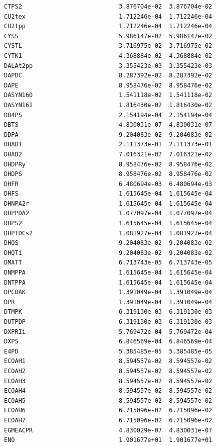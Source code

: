 \documentclass{scrartcl}
\begin{document}
\begin{enumerate}
\begin{lstlisting}
CTPS2                           3.876704e-02  3.876704e-02
CU2tex                          1.712246e-04  1.712246e-04
CU2tpp                          1.712246e-04  1.712246e-04
CYSS                            5.986147e-02  5.986147e-02
CYSTL                           3.716975e-02  3.716975e-02
CYTK1                           4.368884e-02  4.368884e-02
DALAt2pp                        3.355423e-03  3.355423e-03
DAPDC                           8.287392e-02  8.287392e-02
DAPE                            8.958476e-02  8.958476e-02
DASYN160                        1.541118e-02  1.541118e-02
DASYN161                        1.816430e-02  1.816430e-02
DB4PS                           2.154194e-04  2.154194e-04
DBTS                            4.830031e-07  4.830031e-07
DDPA                            9.204083e-02  9.204083e-02
DHAD1                           2.111373e-01  2.111373e-01
DHAD2                           7.016321e-02  7.016321e-02
DHDPRy                          8.958476e-02  8.958476e-02
DHDPS                           8.958476e-02  8.958476e-02
DHFR                            6.480694e-03  6.480694e-03
DHFS                            1.615645e-04  1.615645e-04
DHNPA2r                         1.615645e-04  1.615645e-04
DHPPDA2                         1.077097e-04  1.077097e-04
DHPS2                           1.615645e-04  1.615645e-04
DHPTDCs2                        1.081927e-04  1.081927e-04
DHQS                            9.204083e-02  9.204083e-02
DHQTi                           9.204083e-02  9.204083e-02
DMATT                           6.713743e-05  6.713743e-05
DNMPPA                          1.615645e-04  1.615645e-04
DNTPPA                          1.615645e-04  1.615645e-04
DPCOAK                          1.391049e-04  1.391049e-04
DPR                             1.391049e-04  1.391049e-04
DTMPK                           6.319130e-03  6.319130e-03
DUTPDP                          6.319130e-03  6.319130e-03
DXPRIi                          5.769472e-04  5.769472e-04
DXPS                            6.846569e-04  6.846569e-04
E4PD                            5.385485e-05  5.385485e-05
ECOAH1                          8.594557e-02  8.594557e-02
ECOAH2                          8.594557e-02  8.594557e-02
ECOAH3                          8.594557e-02  8.594557e-02
ECOAH4                          8.594557e-02  8.594557e-02
ECOAH5                          8.594557e-02  8.594557e-02
ECOAH6                          6.715096e-02  6.715096e-02
ECOAH7                          6.715096e-02  6.715096e-02
EGMEACPR                        4.830029e-07  4.830031e-07
ENO                             1.901677e+01  1.901677e+01

\end{lstlisting}
\end{enumerate}
\end{document}
